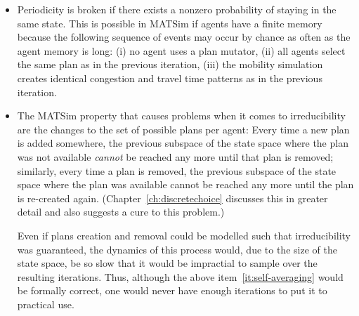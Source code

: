 \begin{itemize}

\item 

Periodicity is broken if there exists a nonzero probability of staying in
the same state. This is possible in MATSim if agents have a finite memory
because the following sequence of events may occur by chance as often as the 
agent memory is long: 
(i) no agent uses a plan mutator, 
(ii) all agents select the same plan as in the previous iteration, 
(iii) the mobility simulation creates identical congestion and travel time patterns as in the previous iteration.


\item 


The MATSim property that causes problems when it comes to irreducibility 
are the changes to the set of possible plans per agent: 
Every time a new plan is added somewhere, the previous subspace of the state space where the plan 
was not available \emph{cannot} be reached any more until that plan is removed; similarly, every time 
a plan is removed, the previous subspace of the state space where the plan was available cannot be 
reached any more until the plan is re-created again. (Chapter~\ref{ch:discretechoice}
discusses this in greater detail and also suggests a cure to this problem.)

Even if plans creation and removal could be modelled such that irreducibility was guaranteed, 
the dynamics of this process would, due to the size of the state space, be so slow that it would be 
impractial to sample over the resulting iterations. Thus, although the above item~\ref{it:self-averaging} 
would be formally correct, one would never have enough iterations to put it to practical use.

\end{itemize}

